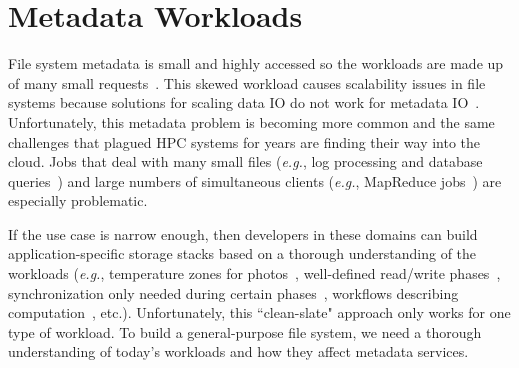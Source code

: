 
\section{Metadata Workloads}

File system metadata is small and highly accessed so the workloads are made up
of many small requests~\cite{roselli:atec2000-FS-workloads,
abad:ucc2012-mimesis}.  This skewed workload causes scalability issues in file
systems because solutions for scaling data IO do not work for metadata
IO~\cite{roselli:atec2000-FS-workloads, abad:techreport2012-fstrace,
alam:pdsw2011-metadata-scaling, weil:osdi2006-ceph}.  Unfortunately, this
metadata problem is becoming more common and the same challenges that plagued
HPC systems for years are finding their way into the cloud.  Jobs that deal
with many small files ({\it e.g.}, log processing and database
queries~\cite{thusoo:sigmod2010-facebook-infrastructure}) and large numbers of
simultaneous clients ({\it e.g.}, MapReduce
jobs~\cite{mckusick:acm2010-gfs-evolution}) are especially problematic.

If the use case is narrow enough, then developers in these domains can build
application-specific storage stacks based on a thorough understanding of the
workloads ({\it e.g.}, temperature zones for
photos~\cite{muralidhar:osdi2014-f4}, well-defined read/write
phases~\cite{dean:osdi2004-mapreduce, dean_evolution_2010}, synchronization
only needed during certain phases~\cite{hakimzadeh:dais14-hdfs-consistency,
zheng:pdsw2015-deltafs}, workflows describing computation~\cite{yoo_slurm_2003,
gamblin_spack_2015}, etc.). Unfortunately, this ``clean-slate" approach only
works for one type of workload. To build a general-purpose file system, we need
a thorough understanding of today's workloads and how they affect metadata
services.  

